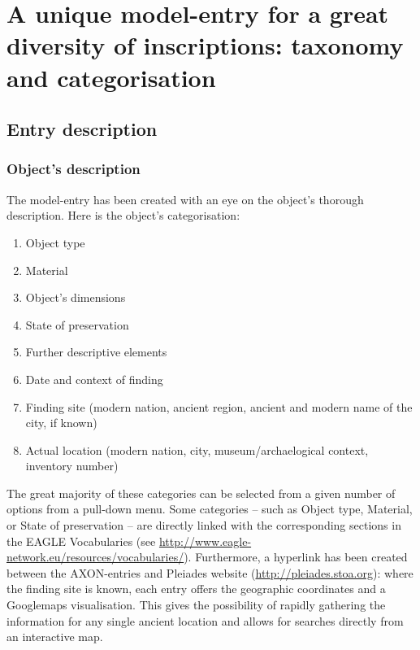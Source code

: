 \documentclass[amsthm,ebook]{saparticle}
\begin{document}
\section{A unique model-entry for a great diversity of inscriptions: taxonomy and categorisation}





\subsection{Entry description}

\subsubsection{Object’s description}


\noindent The model-entry has been created with an eye on the object’s thorough description. Here is the object’s categorisation:

\begin{enumerate}
\item Object type
\item Material
\item Object’s dimensions
\item State of preservation
\item Further descriptive elements
\item Date and context of finding
\item Finding site (modern nation, ancient region, ancient and modern name of the city, if known)
\item Actual location (modern nation, city, museum/archaelogical context, inventory number)
\end{enumerate}
The great majority of these categories can be selected from a given number of options from a pull-down menu. Some
categories – such as Object type, Material, or State of preservation – are directly linked with the corresponding
sections in the EAGLE Vocabularies (see \url{http://www.eagle-network.eu/resources/vocabularies/}). Furthermore, a hyperlink
has been created between the AXON-entries and Pleiades website (\url{http://pleiades.stoa.org}): where the finding site is
known, each entry offers the geographic coordinates and a Googlemaps visualisation. This gives the possibility of
rapidly gathering the information for any single ancient location and allows for searches directly from an interactive
map.
\end{document}

